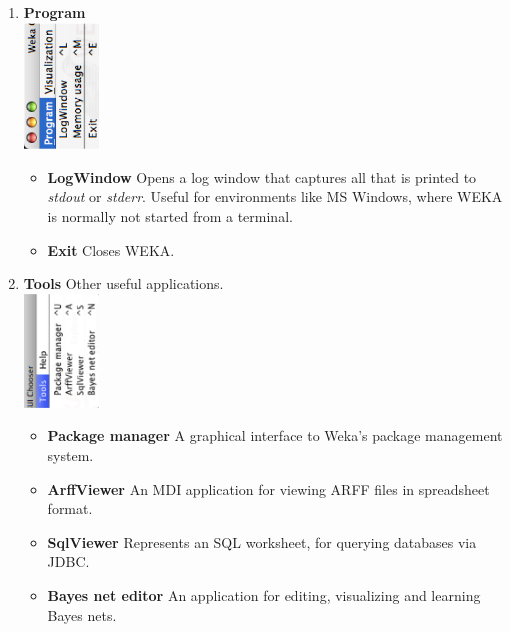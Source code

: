 \begin{enumerate}
	\item \textbf{Program} \\
	        \includegraphics[angle=270,width=2cm]{images/launching/guic_program.eps}
		\begin{itemize}
			\item \textbf{LogWindow} Opens a log window that captures all that is printed to \textit{stdout} or \textit{stderr}. Useful for environments like MS Windows, where WEKA is normally not started from a terminal.
			\item \textbf{Exit} Closes WEKA.
		\end{itemize}
				
	\item \textbf{Tools} Other useful applications. \\
                \includegraphics[angle=270,width=2cm]{images/launching/guic_tools.eps}
		\begin{itemize}
                        \item \textbf{Package manager} A graphical interface to Weka's package management system.
			\item \textbf{ArffViewer} An MDI application for viewing ARFF files in spreadsheet format.
			\item \textbf{SqlViewer} Represents an SQL worksheet, for querying databases via JDBC.
                        \item \textbf{Bayes net editor} An application for editing, visualizing and learning Bayes nets.
		\end{itemize}
		

\end{enumerate}
